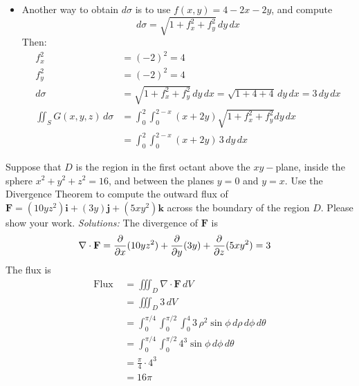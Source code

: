 {\begin{itemize}
    \item Another way to obtain $d\sigma$ is to use $f(x,y) = 4-2x-2y$, and compute $$d\sigma = \sqrt{1+f_x^2+f_y^2} \, dy\,dx$$
    Then:
        \begin{align}
            f_x^2 &= (-2)^2 = 4\\
            f_y^2 &= (-2)^2 = 4 \\
            d\sigma &= \sqrt{1+f_x^2+f_y^2} \, dy\,dx = \sqrt{1+4+4}\, dy\,dx = 3 \, dy\,dx \\
            \iint_S G(x,y,z) \, d\sigma 
        &= \int_0^2 \int_0^{2-x} (x+2y)  \sqrt{1+f_x^2+f_y^2} dy\,dx \\& = \int_0^2 \int_0^{2-x} (x+2y)\, 3 \, dy\, dx 
        \end{align}    

    \end{itemize}
    } 
   \else
      
   \fi
\fi 






\ifnum {}
    \question[4] Suppose that $D$ is the region in the first octant above the $xy-$plane, inside the sphere $x^2+y^2 + z^2 = 16$, and between the planes $y=0$ and $y=x$. Use the Divergence Theorem to compute the outward flux of $\mathbf F = (10yz^2)\mathbf i + (3y)\mathbf j + (5xy^2)\mathbf k$ across the boundary of the region $D$. Please show your work. 
    \ifnum {} {\color{DarkBlue}  \textit{Solutions:} 
    The divergence of $\mathbf F$ is 
    \begin{align}
        \nabla \cdot \mathbf F 
        &= \frac{\partial}{\partial x}(10yz^2) + \frac{\partial}{\partial y}( 3y) + \frac{\partial}{\partial z} (5xy^2) = 3
    \end{align}
    The flux is
    \begin{align}
        \text{Flux } &= \iiint_D \nabla \cdot \mathbf F \, dV \\
        &= \iiint_D  3 \, dV \\
        &= \int_0^{\pi/4} \int_0^{\pi/2} \int_0^4 3 \, \rho^2 \sin\phi \, d\rho \, d\phi \, d\theta \\
        &=  \int_0^{\pi/4} \int_0^{\pi/2}  4^3 \sin\phi \,  d\phi \, d\theta \\
        &=  \frac{\pi}{4}\cdot 4^3 \\
        &= 16\pi
    \end{align}
    } 
   \else
   \fi
\fi


